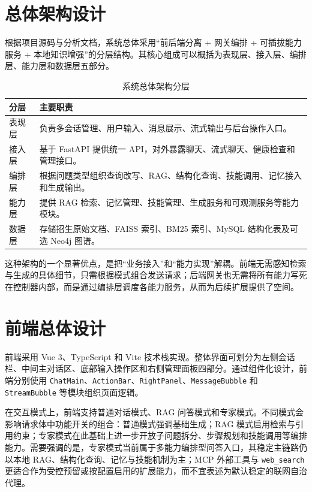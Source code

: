 \documentclass[UTF8,zihao=-4,oneside,fontset=windows]{ctexbook}
\numberwithin{equation}{chapter}
\begin{document}
\section{总体架构设计}
根据项目源码与分析文档，系统总体采用“前后端分离 + 网关编排 + 可插拔能力服务 + 本地知识增强”的分层结构\cite{projectanalysis,projectreadme}。其核心组成可以概括为表现层、接入层、编排层、能力层和数据层五部分。

\begin{table}[H]
  \centering
  \caption{系统总体架构分层}
  \begin{tabularx}{0.95\textwidth}{>{\raggedright\arraybackslash}p{2.8cm} >{\raggedright\arraybackslash}X}
    \toprule
    分层 & 主要职责 \\
    \midrule
    表现层 & 负责多会话管理、用户输入、消息展示、流式输出与后台操作入口。 \\
    接入层 & 基于 FastAPI 提供统一 API，对外暴露聊天、流式聊天、健康检查和管理接口。 \\
    编排层 & 根据问题类型组织查询改写、RAG、结构化查询、技能调用、记忆接入和生成输出。 \\
    能力层 & 提供 RAG 检索、记忆管理、技能管理、生成服务和可观测服务等能力模块。 \\
    数据层 & 存储招生原始文档、FAISS 索引、BM25 索引、MySQL 结构化表及可选 Neo4j 图谱。 \\
    \bottomrule
  \end{tabularx}
\end{table}

这种架构的一个显著优点，是把“业务接入”和“能力实现”解耦。前端无需感知检索与生成的具体细节，只需根据模式组合发送请求；后端网关也无需将所有能力写死在控制器内部，而是通过编排层调度各能力服务，从而为后续扩展提供了空间。

\section{前端总体设计}
前端采用 Vue 3、TypeScript 和 Vite 技术栈实现\cite{projectanalysis}。整体界面可划分为左侧会话栏、中间主对话区、底部输入操作区和右侧管理面板四部分。通过组件化设计，前端分别使用 \texttt{ChatMain}、\texttt{ActionBar}、\texttt{RightPanel}、\texttt{MessageBubble} 和 \texttt{StreamBubble} 等模块组织页面逻辑。

在交互模式上，前端支持普通对话模式、RAG 问答模式和专家模式。不同模式会影响请求体中功能开关的组合：普通模式强调基础生成；RAG 模式启用检索与引用约束；专家模式在此基础上进一步开放子问题拆分、步骤规划和技能调用等编排能力。需要强调的是，专家模式当前属于多能力编排型问答入口，其稳定主链路仍以本地 RAG、结构化查询、记忆与技能机制为主；MCP 外部工具与 \texttt{web\_search} 更适合作为受控预留或按配置启用的扩展能力，而不宜表述为默认稳定的联网自治代理。
\end{document}

